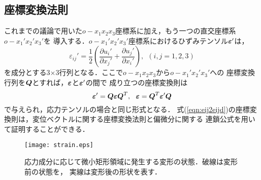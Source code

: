 \documentclass[10pt,a4j]{jbook}
\begin{document}
\subsection{座標変換法則}
これまでの議論で用いた$o-x_1x_2x_3$座標系に加え，もう一つの直交座標系$o-x_1'x_2'x_3'$を
導入する．$o-x_1'x_2'x_3'$座標系におけるひずみテンソル$\mbox{\boldmath $\varepsilon$}'$は，
\begin{equation}
	\varepsilon_{ij}'=\frac{1}{2}
	\left(
	\frac{\partial u_i'}{\partial x_j'}
	+
	\frac{\partial u_j'}{\partial x_i'}
	\right), \ \ (i,j=1,2,3)
	\label{eqn:def_eijd}
\end{equation}
を成分とする3$\times$3行列となる．ここで$o-x_1x_2x_3$から$o-x_1'x_2'x_3'$への
座標変換行列を$\mbox{\boldmath $Q$}$とすれば，$\mbox{\boldmath $\varepsilon$}$と$\mbox{\boldmath $\varepsilon$}'$の間で
成り立つの座標変換則は
\begin{equation}
	\fat{\varepsilon}'=\fat{Q}\fat{\varepsilon}\fat{Q}^T, \ \ 
	\fat{\varepsilon}=\fat{Q}^T\fat{\varepsilon}'\fat{Q} 
	\label{eqn:eij2eijd}
\end{equation}
で与えられ，応力テンソルの場合と同じ形式となる．
式(\ref{eqn:eij2eijd})の座標変換則は，変位ベクトルに関する座標変換法則と偏微分に関する
連鎖公式を用いて証明することができる．
\begin{figure}[h]
	\begin{center}
	\texttt{[image: strain.eps]} 
	\end{center}
	\caption{応力成分に応じて微小矩形領域に発生する変形の状態．破線は変形前の状態を，
	実線は変形後の形状を表す．} 
	\label{fig:fig3_1}
\end{figure}
\newpage
\end{document}
